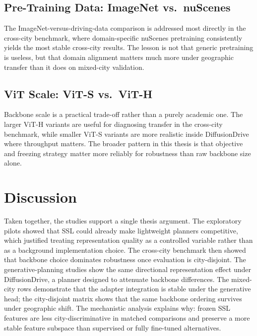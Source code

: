 \subsection{Pre-Training Data: ImageNet vs.\ nuScenes}
The ImageNet-versus-driving-data comparison is addressed most directly in the cross-city benchmark, where domain-specific nuScenes pretraining consistently yields the most stable cross-city results. The lesson is not that generic pretraining is useless, but that domain alignment matters much more under geographic transfer than it does on mixed-city validation.

\subsection{ViT Scale: ViT-S vs.\ ViT-H}
Backbone scale is a practical trade-off rather than a purely academic one. The larger ViT-H variants are useful for diagnosing transfer in the cross-city benchmark, while smaller ViT-S variants are more realistic inside DiffusionDrive where throughput matters. The broader pattern in this thesis is that objective and freezing strategy matter more reliably for robustness than raw backbone size alone.

\section{Discussion}
\label{sec:exp-discussion}

Taken together, the studies support a single thesis argument. The exploratory pilots showed that SSL could already make lightweight planners competitive, which justified treating representation quality as a controlled variable rather than as a background implementation choice. The cross-city benchmark then showed that backbone choice dominates robustness once evaluation is city-disjoint. The generative-planning studies show the same directional representation effect under DiffusionDrive, a planner designed to attenuate backbone differences. The mixed-city rows demonstrate that the adapter integration is stable under the generative head; the city-disjoint matrix shows that the same backbone ordering survives under geographic shift. The mechanistic analysis explains why: frozen SSL features are less city-discriminative in matched comparisons and preserve a more stable feature subspace than supervised or fully fine-tuned alternatives.

